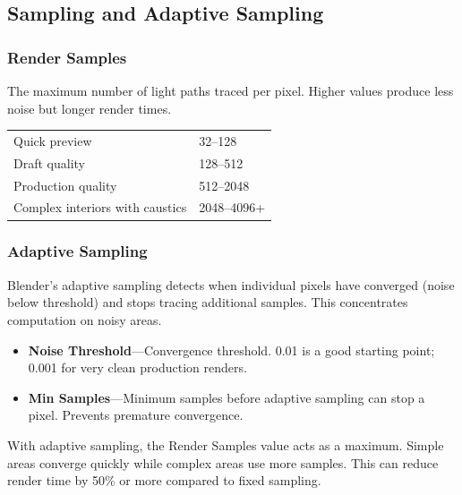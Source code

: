 \subsection{Sampling and Adaptive Sampling}
\label{sec:shading:cycles:sampling}

\subsubsection{Render Samples}

The maximum number of light paths traced per pixel. Higher values
produce less noise but longer render times.

\begin{center}
\begin{tabularx}{\textwidth}{L{4cm}X}
\toprule
{}
 &  \\
\midrule
Quick preview & 32--128 \\
Draft quality & 128--512 \\
Production quality & 512--2048 \\
Complex interiors with caustics & 2048--4096+ \\
\bottomrule
\end{tabularx}
\end{center}

\subsubsection{Adaptive Sampling}

Blender's adaptive sampling detects when individual pixels have
converged (noise below threshold) and stops tracing additional
samples. This concentrates computation on noisy areas.

\begin{itemize}[leftmargin=2em]
  \item \textbf{Noise Threshold}---Convergence threshold. 0.01 is a
        good starting point; 0.001 for very clean production renders.
  \item \textbf{Min Samples}---Minimum samples before adaptive
        sampling can stop a pixel. Prevents premature convergence.
\end{itemize}

With adaptive sampling, the Render Samples value acts as a maximum.
Simple areas converge quickly while complex areas use more samples.
This can reduce render time by 50\% or more compared to fixed
sampling.

